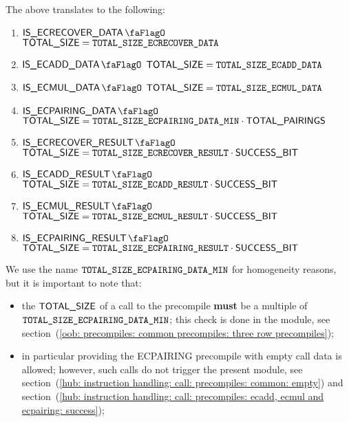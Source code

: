 \saNote{} The above translates to the following:
\begin{enumerate}
    \item \If $\isEcrecoverData$   \Then $\textsf{TOTAL\_SIZE} = \texttt{TOTAL\_SIZE\_ECRECOVER\_DATA}$
    \item \If $\isEcaddData$       \Then $\textsf{TOTAL\_SIZE} = \texttt{TOTAL\_SIZE\_ECADD\_DATA}$
    \item \If $\isEcmulData$       \Then $\textsf{TOTAL\_SIZE} = \texttt{TOTAL\_SIZE\_ECMUL\_DATA}$
    \item \If $\isEcpairingData$   \Then $\textsf{TOTAL\_SIZE} = \texttt{TOTAL\_SIZE\_ECPAIRING\_DATA\_MIN} \cdot \textsf{TOTAL\_PAIRINGS}$    %
    \item \If $\isEcrecoverResult$ \Then $\textsf{TOTAL\_SIZE} = \texttt{TOTAL\_SIZE\_ECRECOVER\_RESULT} \cdot \textsf{SUCCESS\_BIT}$
    \item \If $\isEcaddResult$     \Then $\textsf{TOTAL\_SIZE} = \texttt{TOTAL\_SIZE\_ECADD\_RESULT}     \cdot \textsf{SUCCESS\_BIT}$
    \item \If $\isEcmulResult$     \Then $\textsf{TOTAL\_SIZE} = \texttt{TOTAL\_SIZE\_ECMUL\_RESULT}     \cdot \textsf{SUCCESS\_BIT}$
    \item \If $\isEcpairingResult$ \Then $\textsf{TOTAL\_SIZE} = \texttt{TOTAL\_SIZE\_ECPAIRING\_RESULT} \cdot \textsf{SUCCESS\_BIT}$
\end{enumerate}

\saNote{} We use the name $\texttt{TOTAL\_SIZE\_ECPAIRING\_DATA\_MIN}$ for homogeneity reasons, but it is important to note that:
\begin{itemize}
    \item
        the $\textsf{TOTAL\_SIZE}$ of a call to the  precompile \textbf{must} be a multiple of $\texttt{TOTAL\_SIZE\_ECPAIRING\_DATA\_MIN}$;
        this check is done in the \oobMod{} module, see
        section~(\ref{oob: precompiles: common precompiles: three row precompiles}); 
    \item
        in particular providing the ECPAIRING precompile with empty call data is allowed;
        however, such calls do not trigger the present module, see
        section~(\ref{hub: instruction handling: call: precompiles: common: empty}) and
        section~(\ref{hub: instruction handling: call: precompiles: ecadd, ecmul and ecpairing: success});
\end{itemize}
